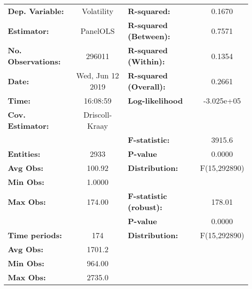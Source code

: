 \begin{center}
\begin{tabular}{lclc}
\toprule
\textbf{Dep. Variable:}                &     Volatility     & \textbf{  R-squared:         }   &      0.1670      \\
\textbf{Estimator:}                    &      PanelOLS      & \textbf{  R-squared (Between):}  &      0.7571      \\
\textbf{No. Observations:}             &       296011       & \textbf{  R-squared (Within):}   &      0.1354      \\
\textbf{Date:}                         &  Wed, Jun 12 2019  & \textbf{  R-squared (Overall):}  &      0.2661      \\
\textbf{Time:}                         &      16:08:59      & \textbf{  Log-likelihood     }   &    -3.025e+05    \\
\textbf{Cov. Estimator:}               &   Driscoll-Kraay   & \textbf{                     }   &                  \\
\textbf{}                              &                    & \textbf{  F-statistic:       }   &      3915.6      \\
\textbf{Entities:}                     &        2933        & \textbf{  P-value            }   &      0.0000      \\
\textbf{Avg Obs:}                      &       100.92       & \textbf{  Distribution:      }   &   F(15,292890)   \\
\textbf{Min Obs:}                      &       1.0000       & \textbf{                     }   &                  \\
\textbf{Max Obs:}                      &       174.00       & \textbf{  F-statistic (robust):} &      178.01      \\
\textbf{}                              &                    & \textbf{  P-value            }   &      0.0000      \\
\textbf{Time periods:}                 &        174         & \textbf{  Distribution:      }   &   F(15,292890)   \\
\textbf{Avg Obs:}                      &       1701.2       & \textbf{                     }   &                  \\
\textbf{Min Obs:}                      &       964.00       & \textbf{                     }   &                  \\
\textbf{Max Obs:}                      &       2735.0       & \textbf{                     }   &                  \\

\end{tabular}
\end{center}
